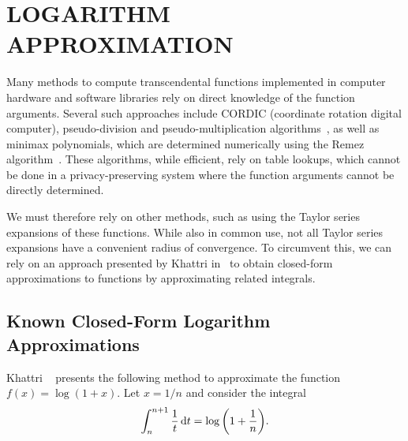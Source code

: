 \chapter{LOGARITHM APPROXIMATION}
\label{chap:logarithm_approximation}
Many methods to compute transcendental functions implemented in computer hardware and software libraries rely on direct knowledge of the function arguments. Several such approaches include CORDIC (coordinate rotation digital computer), pseudo-division and pseudo-multiplication algorithms~\cite{walther_cordic_2000}, as well as minimax polynomials, which are determined numerically using the Remez algorithm~\cite{harrison_computation_1999}. These algorithms, while efficient, rely on table lookups, which cannot be done in a privacy-preserving system where the function arguments cannot be directly determined.

We must therefore rely on other methods, such as using the Taylor series expansions of these functions. While also in common use, not all Taylor series expansions have a convenient radius of convergence. To circumvent this, we can rely on an approach presented by Khattri in~\cite{khattri_new_2009} to obtain closed-form approximations to functions by approximating related integrals.

\section{Known Closed-Form Logarithm Approximations}
Khattri ~\cite{khattri_new_2009} presents the following method to approximate the function $f(x)=\log\left(1+x\right)$.
Let $x = 1/n$ and consider the integral
\begin{align}
	\label{eq:log_integral}
	\int_{n}^{n+1}{\frac{1}{t}\mathop{}\!\mathrm{d} t}=\log{\left(1+\frac{1}{n}\right)}.
\end{align}


